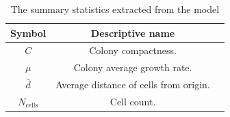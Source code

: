 \begin{table}[!htb]
\begin{center}
    \begin{tabular}{ |c|c|c| } 
     \hline
      \textbf{Symbol} & \textbf{Descriptive name} \\ 
      \hline
     $C$                 &  Colony compactness. \\ 
     $\mu$               & Colony average growth rate. \\ 
     $\bar{d}$           &   Average distance of cells from origin. \\ 
     $N_{\textrm{cells}}$ & Cell count. \\
     \hline   
    \end{tabular}
    
\end{center}
\caption{The summary statistics extracted from the model}
\label{table:summaryStats}
\end{table}












